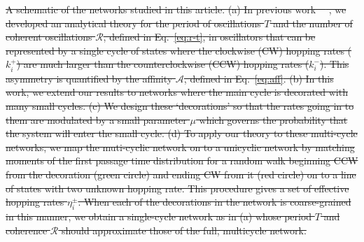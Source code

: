\documentclass[amsmath, preprintnumbers, 10pt, twocolumn, pre, bibliograpy]{revtex4-1}
\newcommand{\R}{\mathcal R}
\providecommand{\DIFdel}[1]{{\protect\color{red}\sout{#1}}}                      %
\providecommand{\DIFdelbegin}{} %
\providecommand{\DIFdelFL}[1]{\DIFdel{#1}} %
\newcommand{\DIFscaledelfig}{0.5}
\newlength{\DIFdelgraphicswidth} %
\newlength{\DIFdelgraphicsheight} %
\newcommand{\DIFdelincludegraphics}[2][]{%
\sbox{\DIFdelgraphicsbox}{\DIFOincludegraphics[#1]{#2}}%
\settoboxwidth{\DIFdelgraphicswidth}{\DIFdelgraphicsbox} %
\settoboxtotalheight{\DIFdelgraphicsheight}{\DIFdelgraphicsbox} %
\scalebox{\DIFscaledelfig}{%
\parbox[b]{\DIFdelgraphicswidth}{\usebox{\DIFdelgraphicsbox}\\[-\baselineskip] \rule{\DIFdelgraphicswidth}{0em}}\llap{\resizebox{\DIFdelgraphicswidth}{\DIFdelgraphicsheight}{%
\setlength{\unitlength}{\DIFdelgraphicswidth}%
\begin{picture}(1,1)%
\thicklines\linethickness{2pt} %
{\color[rgb]{1,0,0}\put(0,0){\framebox(1,1){}}}%
{\color[rgb]{1,0,0}\put(0,0){\line( 1,1){1}}}%
{\color[rgb]{1,0,0}\put(0,1){\line(1,-1){1}}}%
\end{picture}%
}\hspace*{3pt}}} %
} %
\DeclareRobustCommand{\DIFdelbegin}{\DIFOdelbegin \let\includegraphics\DIFdelincludegraphics} %
\begin{document}
\DIFdelbegin %
{%
\DIFdelFL{A schematic of the networks studied in this article. (a) In previous work~\mbox{%
\cite{DelJunco2018b}}%
, we developed an analytical theory for the period of oscillations $T$ and the number of coherent oscillations $\R$, defined in Eq.~\ref{eq:r-t}, in oscillators that can be represented by a single cycle of states where the clockwise (CW) hopping rates ($k_i^+$) are much larger than the counterclockwise (CCW) hopping rates ($k_i^-$). This asymmetry is quantified by the affinity $\mathcal A$, defined in Eq.~\ref{eq:aff}. (b) In this work, we extend our results to networks where the main cycle is decorated with many small cycles. (c) We design these `decorations' so that the rates going in to them are modulated by a small parameter $\mu$ which governs the probability that the system will enter the small cycle. (d) To apply our theory to these multi-cycle networks, we map the muti-cyclic network on to a unicyclic network by matching moments of the first passage time distribution for a random walk beginning CCW from the decoration (green circle) and ending CW from it (red circle) on to a line of states with two unknown hopping rate. This procedure gives a set of effective hopping rates $\eta_i^\pm$. When each of the decorations in the network is coarse-grained in this manner, we obtain a single-cycle network as in (a) whose period $T$ and coherence $\R$ should approximate those of the full, multicycle network.}}
\end{document}
